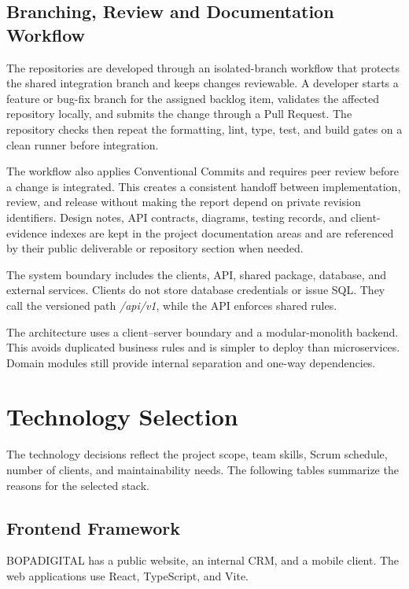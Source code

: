 \documentclass[letterpaper%
, oneside%
, 12pt%
, memoireprojet%
, english%
,creativecommons,hyperref, withAlgo2e %
]{thETS}
\begin{document}
\subsection{Branching, Review and Documentation Workflow}
The repositories are developed through an isolated-branch workflow that protects the shared
integration branch and keeps changes reviewable. A developer starts a feature or bug-fix branch
for the assigned backlog item, validates the affected repository locally, and submits the change
through a Pull Request. The repository checks then repeat the formatting, lint, type, test, and
build gates on a clean runner before integration.

The workflow also applies Conventional Commits and requires peer review before a change is
integrated. This creates a consistent handoff between implementation, review, and release without
making the report depend on private revision identifiers. Design notes, API contracts, diagrams,
testing records, and client-evidence indexes are kept in the project documentation areas and are
referenced by their public deliverable or repository section when needed.

The system boundary includes the clients, API, shared package, database, and external services. Clients do not store database credentials or issue SQL. They call the versioned path \emph{/api/v1}, while the API enforces shared rules.

The architecture uses a client--server boundary and a modular-monolith backend. This avoids duplicated business rules and is simpler to deploy than microservices. Domain modules still provide internal separation and one-way dependencies.

\section{Technology Selection}
The technology decisions reflect the project scope, team skills, Scrum schedule, number of clients, and maintainability needs. The following tables summarize the reasons for the selected stack.

\subsection{Frontend Framework}
BOPADIGITAL has a public website, an internal CRM, and a mobile client. The web applications use React, TypeScript, and Vite.
\end{document}
